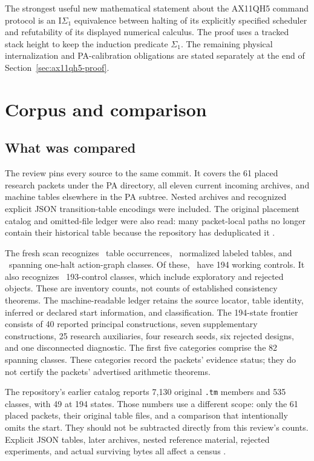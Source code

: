 \documentclass[11pt]{article}
\newcommand{\IS}{\mathrm I\Sigma_1}
\newcommand{\file}[1]{\nolinkurl{#1}}
\begin{document}
The strongest useful new mathematical statement about the AX11QH5 command
protocol is an $\IS$ equivalence between halting of its explicitly specified
scheduler and refutability of its displayed numerical calculus. The proof
uses a tracked stack height to keep the induction predicate $\Sigma_1$.
The remaining physical internalization and PA-calibration obligations are
stated separately at the end of Section~\ref{sec:ax11qh5-proof}.

\section{Corpus and comparison}

\subsection{What was compared}

The review pins every source to the same commit. It covers the 61 placed
research packets under the PA directory, all eleven current incoming
archives, and machine tables elsewhere in the PA subtree. Nested archives
and recognized explicit JSON transition-table encodings were included.
The original placement catalog and omitted-file ledger were also read:
many packet-local paths no longer contain their historical table because
the repository has deduplicated it \cite{machine-catalog,packet-catalog}.

The fresh scan recognizes \TableOccurrences\ table occurrences,
\NormalizedTables\ normalized labeled tables, and \GraphClasses\ spanning
one-halt action-graph classes. Of these, \FrontierClasses\ have 194 working
controls. It also recognizes \RuntimeClasses\ 193-control classes, which
include exploratory and rejected objects. These are inventory counts, not
counts of established consistency theorems. The machine-readable ledger
retains the source locator, table identity, inferred or declared start
information, and classification. The 194-state frontier consists of
40 reported principal constructions, seven supplementary constructions,
25 research auxiliaries, four research seeds, six rejected designs, and
one disconnected diagnostic. The first five categories comprise the 82
spanning classes. These categories record the packets' evidence status;
they do not certify the packets' advertised arithmetic theorems.

The repository's earlier catalog reports 7,130 original \file{.tm} members
and 535 classes, with 49 at 194 states. Those numbers use a different scope:
only the 61 placed packets, their original table files, and a comparison
that intentionally omits the start. They should not be subtracted directly
from this review's counts. Explicit JSON tables, later archives, nested
reference material, rejected experiments, and actual surviving bytes all
affect a census \cite{machine-catalog}.
\end{document}
